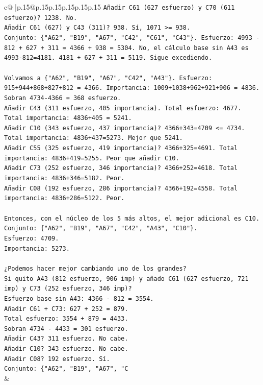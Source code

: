 \documentclass{article}
\begin{document}
{\begin{supertabular}{c@{$\;$}|p{.15\linewidth}@{}p{.15\linewidth}p{.15\linewidth}p{.15\linewidth}p{.15\linewidth}p{.15\linewidth}}
{{{\texttt{Añadir C61 (627 esfuerzo) y C70 (611 esfuerzo)? 1238. No.} \\
\texttt{Añadir C61 (627) y C43 (311)? 938. Sí, 1071 >= 938.} \\
\texttt{Conjunto: \{"A62", "B19", "A67", "C42", "C61", "C43"\}. Esfuerzo: 4993 {-} 812 + 627 + 311 = 4366 + 938 = 5304. No, el cálculo base sin A43 es 4993{-}812=4181. 4181 + 627 + 311 = 5119. Sigue excediendo.} \\
\\ 
\texttt{Volvamos a \{"A62", "B19", "A67", "C42", "A43"\}. Esfuerzo: 915+944+868+827+812 = 4366. Importancia: 1009+1038+962+921+906 = 4836. Sobran 4734{-}4366 = 368 esfuerzo.} \\
\texttt{Añadir C43 (311 esfuerzo, 405 importancia). Total esfuerzo: 4677. Total importancia: 4836+405 = 5241.} \\
\texttt{Añadir C10 (343 esfuerzo, 437 importancia)? 4366+343=4709 <= 4734. Total importancia: 4836+437=5273. Mejor que 5241.} \\
\texttt{Añadir C55 (325 esfuerzo, 419 importancia)? 4366+325=4691. Total importancia: 4836+419=5255. Peor que añadir C10.} \\
\texttt{Añadir C73 (252 esfuerzo, 346 importancia)? 4366+252=4618. Total importancia: 4836+346=5182. Peor.} \\
\texttt{Añadir C08 (192 esfuerzo, 286 importancia)? 4366+192=4558. Total importancia: 4836+286=5122. Peor.} \\
\\ 
\texttt{Entonces, con el núcleo de los 5 más altos, el mejor adicional es C10.} \\
\texttt{Conjunto: \{"A62", "B19", "A67", "C42", "A43", "C10"\}.} \\
\texttt{Esfuerzo: 4709.} \\
\texttt{Importancia: 5273.} \\
\\ 
\texttt{¿Podemos hacer mejor cambiando uno de los grandes?} \\
\texttt{Si quito A43 (812 esfuerzo, 906 imp) y añado C61 (627 esfuerzo, 721 imp) y C73 (252 esfuerzo, 346 imp)?} \\
\texttt{Esfuerzo base sin A43: 4366 {-} 812 = 3554.} \\
\texttt{Añadir C61 + C73: 627 + 252 = 879.} \\
\texttt{Total esfuerzo: 3554 + 879 = 4433.} \\
\texttt{Sobran 4734 {-} 4433 = 301 esfuerzo.} \\
\texttt{Añadir C43? 311 esfuerzo. No cabe.} \\
\texttt{Añadir C10? 343 esfuerzo. No cabe.} \\
\texttt{Añadir C08? 192 esfuerzo. Sí.} \\
\texttt{Conjunto: \{"A62", "B19", "A67", "C} \\
            }
        }
    }
    & \\ \\


\end{supertabular}}
\end{document}
